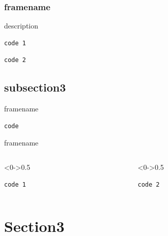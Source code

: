 \documentclass[9pt,aspectratio=43,mathserif,table]{beamer}
\begin{document}
\begin{frame}[fragile]
  \frametitle{framename}
  description  
  \begin{lstlisting}
code 1
  \end{lstlisting}
  \begin{lstlisting}
code 2
  \end{lstlisting}
\end{frame}


\subsection{subsection3}
\begin{frame}[fragile]{framename}
  \begin{lstlisting}
code
  \end{lstlisting}
\end{frame}


\begin{frame}[fragile]{framename}
  \begin{columns}[T]
    \begin{column}<0->{0.5\textwidth}
      \begin{lstlisting}[numbersep=4pt]
code 1
        \end{lstlisting}
    \end{column}
    \hfill
    \begin{column}<0->{0.5\textwidth}
      \begin{lstlisting}[firstnumber=last,numbersep=4pt]
code 2
    \end{lstlisting}
    \end{column}
  \end{columns}
\end{frame}



\section{Section3}
\end{document}
